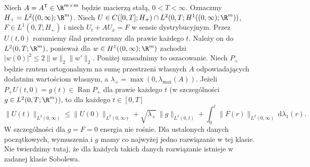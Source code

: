 \begin{twierdzenie}
\label{thm:pde21-halfline-energy}
Niech $A=A^{\mathsf T}\in\R^{m\times m}$ będzie macierzą stałą,
$0<T<\infty$. Oznaczmy $H_+=L^2((0,\infty);\R^m)$.
Niech
$U\in C([0,T];H_+)\cap L^2(0,T;H^1((0,\infty);\R^m))$,
$F\in L^1(0,T;H_+)$ i niech
$U_t+AU_x=F$ w sensie dystrybucyjnym.
Przez $U(t,0)$ rozumiemy ślad przestrzenny
dla prawie każdego $t$. Należy on do
$L^2(0,T;\R^m)$, ponieważ dla $w\in H^1((0,\infty);\R^m)$
zachodzi $|w(0)|^2\le2\|w\|_2\|w'\|_2$.
Poniżej uzasadnimy to oszacowanie.
Niech $P_+$ będzie rzutem ortogonalnym na sumę przestrzeni
własnych $A$ odpowiadających dodatnim wartościom własnym,
a $\lambda_+=\max(0,\lambda_{\max}(A))$. Jeżeli
$P_+U(t,0)=g(t)\in\operatorname{Ran}P_+$
dla prawie każdego $t$ (w szczególności $g\in L^2(0,T;\R^m)$),
to dla każdego $t\in[0,T]$
\[
 \|U(t)\|_{L^2(0,\infty)}\le
 \|U(0)\|_{L^2(0,\infty)}+
 \sqrt{\lambda_+}\,\|g\|_{L^2(0,t)}+
 \int_0^t\|F(r)\|_{L^2(0,\infty)}\,\mathrm d\lambda_1(r).
\]
W szczególności dla $g=F=0$ energia nie rośnie.
Dla ustalonych danych początkowych, wymuszenia
i $g$ mamy co najwyżej jedno rozwiązanie w tej klasie.
Nie twierdzimy tutaj, że dla każdych takich danych
rozwiązanie istnieje w zadanej klasie Sobolewa.
\end{twierdzenie}
